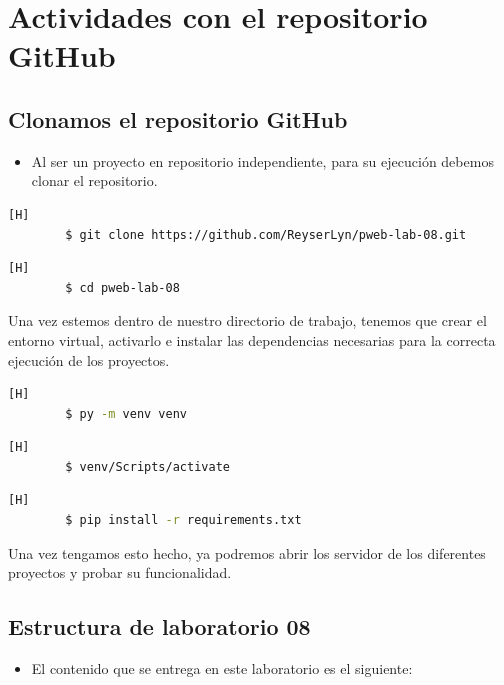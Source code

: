 \documentclass{article}
\begin{document}
	\section{Actividades con el repositorio GitHub}
	
	\subsection{Clonamos el repositorio GitHub}
	\begin{itemize}	
		\item Al ser un proyecto en repositorio independiente, para su ejecución debemos clonar el repositorio.
	\end{itemize}	
		
	\begin{lstlisting}[language=bash,caption={Clonando Repositorio del Laboratorio 08}][H]
		$ git clone https://github.com/ReyserLyn/pweb-lab-08.git
	\end{lstlisting}
	\begin{lstlisting}[language=bash,caption={Dirijíéndonos al directorio de trabajo}][H]
		$ cd pweb-lab-08
	\end{lstlisting}	

        Una vez estemos dentro de nuestro directorio de trabajo, tenemos que crear el entorno virtual, activarlo e instalar las dependencias necesarias para la correcta ejecución de los proyectos.
        
	\begin{lstlisting}[language=bash,caption={Creando entorno virtual}][H]
		$ py -m venv venv
	\end{lstlisting}
         \begin{lstlisting}[language=bash,caption={Activamos nuestro entorno virtual}][H]
		$ venv/Scripts/activate
	\end{lstlisting}
	\begin{lstlisting}[language=bash,caption={Descargando dependencias}][H]
		$ pip install -r requirements.txt
	\end{lstlisting}

        Una vez tengamos esto hecho, ya podremos abrir los servidor de los diferentes proyectos y probar su funcionalidad.
	
	\subsection{Estructura de laboratorio 08}
	\begin{itemize}	
		\item El contenido que se entrega en este laboratorio es el siguiente:
	\end{itemize}
	
\end{document}
